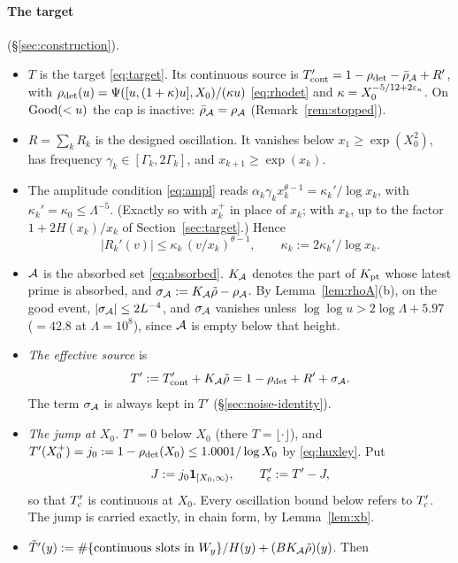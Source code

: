 \paragraph{The target} (\S\ref{sec:construction}).
\begin{itemize}
\item $T$ is the target \eqref{eq:target}. Its continuous source is $T'_{\mathrm{cont}}=1-\rho_{\mathrm{det}}-\bar\rho_{\mathcal{A}}+R'$,
  with $\rho_{\mathrm{det}}(u)=\Psi([u,(1+\kappa)u],X_0)/(\kappa u)$ \eqref{eq:rhodet} and $\kappa=X_0^{-5/12+2\varepsilon_\kappa}$. On
  $\mathrm{Good}(<u)$ the cap is inactive: $\bar\rho_{\mathcal{A}}=\rho_{\mathcal{A}}$ (Remark~\ref{rem:stopped}).
\item $R=\sum_k R_k$ is the designed oscillation. It vanishes below $x_1\ge\exp(X_0^2)$, has frequency
  $\gamma_k\in[\Gamma_k,2\Gamma_k]$, and $x_{k+1}\ge\exp(x_k)$.
\item The amplitude condition \eqref{eq:ampl} reads $\alpha_k\gamma_kx_k^{\theta-1}=\kappa_k'/\log x_k$, with
  $\kappa_k'=\kappa_0\le\Lambda^{-5}$. (Exactly so with $x_k^+$ in place of $x_k$; with $x_k$, up to the factor
  $1+2H(x_k)/x_k$ of Section~\ref{sec:target}.) Hence
  \begin{equation}\label{eq:Rkprime}
    |R_k'(v)|\le\kappa_k\,(v/x_k)^{\theta-1},\qquad \kappa_k:=2\kappa_k'/\log x_k.
  \end{equation}
\item $\mathcal{A}$ is the absorbed set \eqref{eq:absorbed}. $K_{\mathcal{A}}$ denotes the part of $K_{\mathrm{pt}}$ whose latest prime is
  absorbed, and $\sigma_{\mathcal{A}}:=K_{\mathcal{A}}\tilde\rho-\rho_{\mathcal{A}}$. By Lemma~\ref{lem:rhoA}(b), on the good event, $|\sigma_{\mathcal{A}}|\le 2L^{-4}$, and
  $\sigma_{\mathcal{A}}$ vanishes unless $\log\log u>2\log\Lambda+5.97$ ($=42.8$ at $\Lambda=10^8$), since $\mathcal{A}$ is empty below
  that height.
\item \emph{The effective source} is
  \[
    T':=T'_{\mathrm{cont}}+K_{\mathcal{A}}\tilde\rho=1-\rho_{\mathrm{det}}+R'+\sigma_{\mathcal{A}}.
  \]
  The term $\sigma_{\mathcal{A}}$ is always kept in $T'$ (\S\ref{sec:noise-identity}).
\item \emph{The jump at $X_0$.} $T'=0$ below $X_0$ (there $T=\lfloor\cdot\rfloor$), and
  $T'(X_0^+)=j_0:=1-\rho_{\mathrm{det}}(X_0)\le 1.0001/\log X_0$ by \eqref{eq:huxley}. Put
  \[
    J:=j_0\mathbf 1_{[X_0,\infty)},\qquad T'_{\mathrm{c}}:=T'-J,
  \]
  so that $T'_{\mathrm{c}}$ is continuous at $X_0$. Every oscillation bound below refers to $T'_{\mathrm{c}}$. The jump is carried exactly, in
  chain form, by Lemma~\ref{lem:xb}.
\item $\tilde T'(y):=\#\{\text{continuous slots in }W_y\}/H(y)+(BK_{\mathcal{A}}\tilde\rho)(y)$. Then

\end{itemize}

